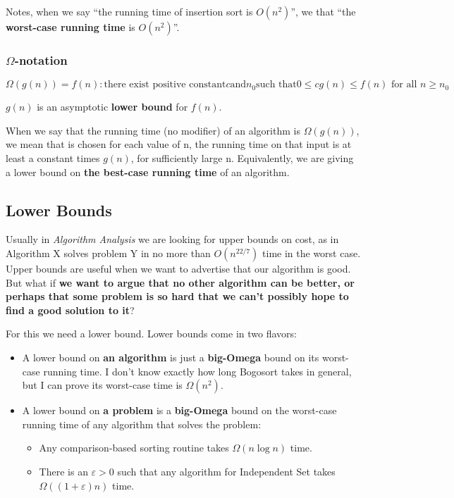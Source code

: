 \documentclass[en,hazy,blue,screen,14pt]{elegantnote}
\begin{document}
Notes, when we say ``the running time of insertion sort is $O(n^{2})$'',
we that ``the \textbf{worst-case running time} is $O(n^{2})$''.

\subsubsection*{$\Omega$-notation}

\[
\Omega(g(n))={f(n):\text{there exist positive constant}c\text{and}n_{0}\text{such that}0\le cg(n)\le f(n)\text{ for all }n\ge n_{0}}
\]

$g(n)$ is an asymptotic \textbf{lower bound} for $f(n)$.

When we say that the running time (no modifier) of an algorithm is
$\Omega(g(n))$, we mean that  is chosen for each value of n, the running time on
that input is at least a constant times $g(n)$, for sufficiently
large n. Equivalently, we are giving a lower bound on \textbf{the
best-case running time} of an algorithm. 

\subsection{Lower Bounds}

Usually in \emph{Algorithm Analysis} we are looking for upper bounds
on cost, as in \textquotedbl Algorithm X solves problem Y in no more
than $O(n^{22/7})$ time in the worst case.\textquotedbl{} Upper bounds
are useful when we want to advertise that our algorithm is good. But
what if \textbf{we want to argue that no other algorithm can be better,
or perhaps that some problem is so hard that we can't possibly hope
to find a good solution to it}?

For this we need a lower bound. Lower bounds come in two flavors:
\begin{itemize}
\item A lower bound on \textbf{an algorithm} is just a \textbf{big-Omega}
bound on its worst-case running time. \textquotedbl I don't know
exactly how long Bogosort takes in general, but I can prove its worst-case
time is $\Omega(n^{2})$.\textquotedbl{}
\item A lower bound on \textbf{a problem} is a \textbf{big-Omega} bound
on the worst-case running time of any algorithm that solves the problem: 
\begin{itemize}
\item \textquotedbl Any comparison-based sorting routine takes $\Omega(n\log n)$
time.\textquotedbl{} 
\item \textquotedbl There is an $\varepsilon>0$ such that any algorithm
for Independent Set takes $\Omega((1+\varepsilon)n)$ time.\textquotedbl{} 
\end{itemize}
\end{itemize}
\end{document}
